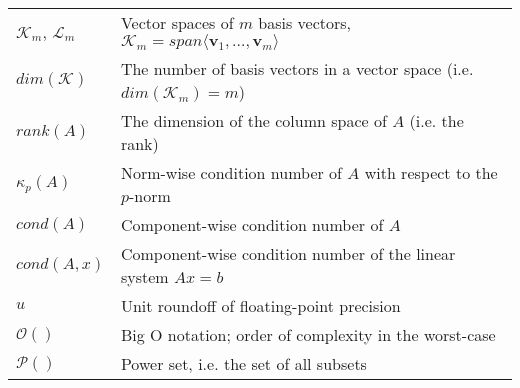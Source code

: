 \begin{tabular}{ll}
  $\mathcal{K}_m$, $\mathcal{L}_m$ & Vector spaces of $m$ basis vectors,  $\mathcal{K}_m=span\langle \bm{v}_1, \dots, \bm{v}_{m} \rangle$ \\
  $dim(\mathcal{K})$ & The number of basis vectors in a vector space (i.e. $dim(\mathcal{K}_m)=m$) \\
  $rank(A)$ & The dimension of the column space of $A$ (i.e. the rank)\\
  $\kappa_{p}(A)$ & Norm-wise condition number of $A$ with respect to the $p$-norm \\
  $cond(A)$ & Component-wise condition number of $A$ \\
  $cond(A, x)$ & Component-wise condition number of the linear system $Ax=b$ \\
  $u$      & Unit roundoff of floating-point precision \\
  $\mathcal{O}()$ & Big O notation; order of complexity in the worst-case\\
  $\mathcal{P}()$ & Power set, i.e. the set of all subsets \\

\end{tabular}
\vspace{0.5cm}